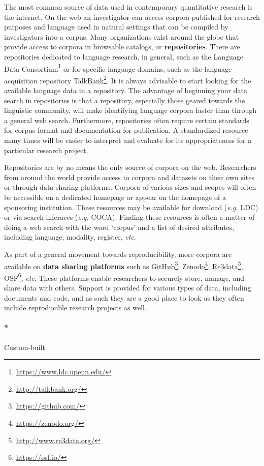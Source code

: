 \documentclass[
  letterpaper,
]{latex/krantz}
\let\oldparagraph\paragraph
\renewcommand{\paragraph}[1]{\oldparagraph{#1}\mbox{}}
\DeclareRobustCommand{\href}[2]{#2\footnote{\url{#1}}}
\begin{document}
The most common source of data used in contemporary quantitative
research is the internet. On the web an investigator can access corpora
published for research purposes and language used in natural settings
that can be compiled by investigators into a corpus. Many organizations
exist around the globe that provide access to corpora in browsable
catalogs, or \textbf{repositories}. There are repositories dedicated to
language research, in general, such as the
\href{https://www.ldc.upenn.edu/}{Language Data Consortium} or for
specific language domains, such as the language acquisition repository
\href{http://talkbank.org/}{TalkBank}. It is always advisable to start
looking for the available language data in a repository. The advantage
of beginning your data search in repositories is that a repository,
especially those geared towards the linguistic community, will make
identifying language corpora faster than through a general web search.
Furthermore, repositories often require certain standards for corpus
format and documentation for publication. A standardized resource many
times will be easier to interpret and evaluate for its appropriateness
for a particular research project.

Repositories are by no means the only source of corpora on the web.
Researchers from around the world provide access to corpora and datasets
on their own sites or through data sharing platforms. Corpora of various
sizes and scopes will often be accessible on a dedicated homepage or
appear on the homepage of a sponsoring institution. These resources may
be available for download (\emph{e.g.} LDC) or via search inferaces
(\emph{e.g.} COCA). Finding these resources is often a matter of doing a
web search with the word `corpus' and a list of desired attributes,
including language, modality, register, \emph{etc}.

As part of a general movement towards reproducibility, more corpora are
available on \textbf{data sharing platforms} such as
\href{https://github.com/}{GitHub}, \href{https://zenodo.org/}{Zenodo},
\href{http://www.re3data.org/}{Re3data}, \href{https://osf.io/}{OSF},
\emph{etc}. These platforms enable researchers to securely store,
manage, and share data with others. Support is provided for various
types of data, including documents and code, and as such they are a good
place to look as they often include reproducible research projects as
well.

\hypertarget{custom-built}{%
\paragraph*{Custom-built}\label{custom-built}}
\end{document}
